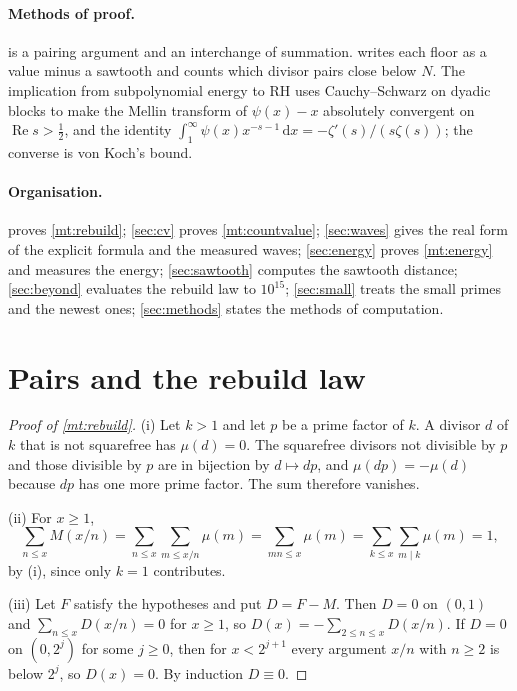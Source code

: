 \documentclass[11pt]{article}
\theoremstyle{definition}\newtheorem{definition}[theorem]{Definition}
\theoremstyle{remark}\newtheorem{remark}[theorem]{Remark}
\newcommand{\dd}{\,\mathrm d}\newcommand{\e}{\mathrm e}
\renewcommand{\Re}{\operatorname{Re}}\renewcommand{\Im}{\operatorname{Im}}
\begin{document}
\paragraph{Methods of proof.}  is a pairing argument and an interchange of summation.  writes each floor as a value minus a sawtooth and counts which divisor pairs close below $N$. The implication from subpolynomial energy to RH uses Cauchy--Schwarz on dyadic blocks to make the Mellin transform of $\psi(x)-x$ absolutely convergent on $\Re s>\frac12$, and the identity $\int_1^\infty\psi(x)x^{-s-1}\dd x=-\zeta'(s)/(s\zeta(s))$; the converse is von Koch's bound.

\paragraph{Organisation.}  proves \cref{mt:rebuild}; \cref{sec:cv} proves \cref{mt:countvalue}; \cref{sec:waves} gives the real form of the explicit formula and the measured waves; \cref{sec:energy} proves \cref{mt:energy} and measures the energy; \cref{sec:sawtooth} computes the sawtooth distance; \cref{sec:beyond} evaluates the rebuild law to $10^{15}$; \cref{sec:small} treats the small primes and the newest ones; \cref{sec:methods} states the methods of computation.

\section{Pairs and the rebuild law}\label{sec:pairs}

\begin{proof}[Proof of \cref{mt:rebuild}]
(i) Let $k>1$ and let $p$ be a prime factor of $k$. A divisor $d$ of $k$ that is not squarefree has $\mu(d)=0$. The squarefree divisors not divisible by $p$ and those divisible by $p$ are in bijection by $d\mapsto dp$, and $\mu(dp)=-\mu(d)$ because $dp$ has one more prime factor. The sum therefore vanishes.

(ii) For $x\ge1$,
\[
\sum_{n\le x}M(x/n)=\sum_{n\le x}\sum_{m\le x/n}\mu(m)=\sum_{mn\le x}\mu(m)=\sum_{k\le x}\sum_{m\mid k}\mu(m)=1,
\]
by (i), since only $k=1$ contributes.

(iii) Let $F$ satisfy the hypotheses and put $D=F-M$. Then $D=0$ on $(0,1)$ and $\sum_{n\le x}D(x/n)=0$ for $x\ge1$, so $D(x)=-\sum_{2\le n\le x}D(x/n)$. If $D=0$ on $(0,2^j)$ for some $j\ge0$, then for $x<2^{j+1}$ every argument $x/n$ with $n\ge2$ is below $2^j$, so $D(x)=0$. By induction $D\equiv0$.
\end{proof}
\end{document}
